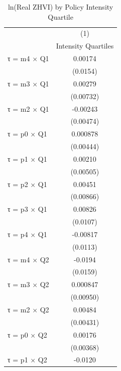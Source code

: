 \begin{table}[htbp]\centering
\def\sym#1{\ifmmode^{#1}\else\(^{#1}\)\fi}
\caption{ln(Real ZHVI) by Policy Intensity Quartile}
\begin{tabular}{l*{1}{c}}
\hline\hline
                    &\multicolumn{1}{c}{(1)}\\
                    &\multicolumn{1}{c}{Intensity Quartiles}\\
\hline
τ = m4 × Q1         &     0.00174         \\
                    &    (0.0154)         \\
[1em]
τ = m3 × Q1         &     0.00279         \\
                    &   (0.00732)         \\
[1em]
τ = m2 × Q1         &    -0.00243         \\
                    &   (0.00474)         \\
[1em]
τ = p0 × Q1         &    0.000878         \\
                    &   (0.00444)         \\
[1em]
τ = p1 × Q1         &     0.00210         \\
                    &   (0.00505)         \\
[1em]
τ = p2 × Q1         &     0.00451         \\
                    &   (0.00866)         \\
[1em]
τ = p3 × Q1         &     0.00826         \\
                    &    (0.0107)         \\
[1em]
τ = p4 × Q1         &    -0.00817         \\
                    &    (0.0113)         \\
[1em]
τ = m4 × Q2         &     -0.0194         \\
                    &    (0.0159)         \\
[1em]
τ = m3 × Q2         &    0.000847         \\
                    &   (0.00950)         \\
[1em]
τ = m2 × Q2         &     0.00484         \\
                    &   (0.00431)         \\
[1em]
τ = p0 × Q2         &     0.00176         \\
                    &   (0.00368)         \\
[1em]
τ = p1 × Q2         &     -0.0120         \\

\end{tabular}
\end{table}
